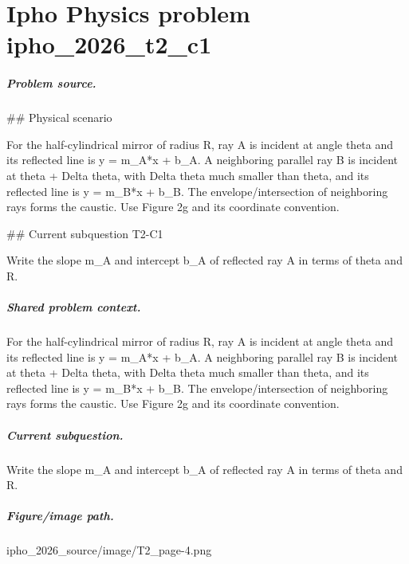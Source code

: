 
\chapter{Ipho Physics problem ipho\_2026\_t2\_c1}
\label{ch:IPhO2026Problems_problem_ipho_2026_t2_c1}

\paragraph{Problem source.}
\#\# Physical scenario

For the half-cylindrical mirror of radius R, ray A is incident at angle theta
and its reflected line is y = m\_A*x + b\_A.  A neighboring parallel ray B is
incident at theta + Delta theta, with Delta theta much smaller than theta, and
its reflected line is y = m\_B*x + b\_B.  The envelope/intersection of neighboring
rays forms the caustic.  Use Figure 2g and its coordinate convention.

\#\# Current subquestion T2-C1

Write the slope m\_A and intercept b\_A of reflected ray A in terms of theta and R.

\paragraph{Shared problem context.}
For the half-cylindrical mirror of radius R, ray A is incident at angle theta
and its reflected line is y = m\_A*x + b\_A.  A neighboring parallel ray B is
incident at theta + Delta theta, with Delta theta much smaller than theta, and
its reflected line is y = m\_B*x + b\_B.  The envelope/intersection of neighboring
rays forms the caustic.  Use Figure 2g and its coordinate convention.

\paragraph{Current subquestion.}
Write the slope m\_A and intercept b\_A of reflected ray A in terms of theta and R.

\paragraph{Figure/image path.}
ipho\_2026\_source/image/T2\_page-4.png

